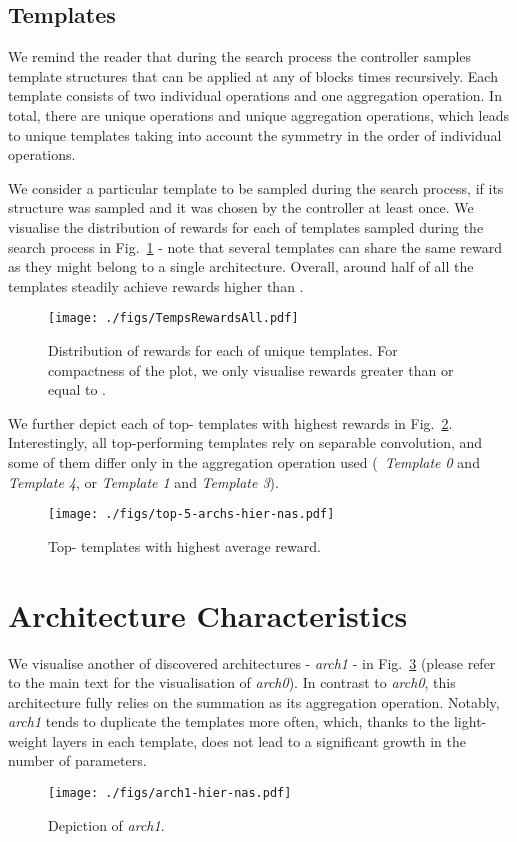 \documentclass[10pt,twocolumn,letterpaper]{article}
\begin{document}
 \subsection*{Templates}
 
 We remind the reader that during the search process the controller samples  template structures that can be applied at any of  blocks  times recursively. Each template consists of two individual operations and one aggregation operation. In total, there are  unique operations and  unique aggregation operations, which leads to  unique templates taking into account the symmetry in the order of individual operations.
 
 We consider a particular template to be sampled during the search process, if its structure was sampled and it was chosen by the controller at least once. We visualise the distribution of rewards for each of  templates sampled during the search process in Fig.~\ref{fig:temp-rew-all} - note that several templates can share the same reward as they might belong to a single architecture. Overall, around half of all the templates steadily achieve rewards higher than .
 
 \begin{figure}[thb]
 	\begin{center}
 		\texttt{[image: ./figs/TempsRewardsAll.pdf]}
 	\end{center}
 	\vskip -0.2in
 	\caption{
 		Distribution of rewards for each of  unique templates. For compactness of the plot, we only visualise rewards greater than or equal to .\label{fig:temp-rew-all}}
 \end{figure}
 
 We further depict each of top- templates with highest rewards in Fig.~\ref{fig:temp-top}. Interestingly, all top-performing templates rely on separable  convolution, and some of them differ only in the aggregation operation used (\eg~{\em Template 0} and {\em Template 4}, or {\em Template 1} and {\em Template 3}). 
 
 \begin{figure}[thb]
 	\begin{center}
 		\texttt{[image: ./figs/top-5-archs-hier-nas.pdf]}
 	\end{center}
 	\caption{
 		Top- templates with highest average reward.\label{fig:temp-top}}
 \end{figure}
 
 \section{Architecture Characteristics}
 We visualise another of discovered architectures - {\em arch1} - in Fig.~\ref{fig:arch1} (please refer to the main text for the visualisation of {\em arch0}). In contrast to {\em arch0}, this architecture fully relies on the summation as its aggregation operation. Notably, {\em arch1} tends to duplicate the templates more often, which, thanks to the light-weight layers in each template, does not lead to a significant growth in the number of parameters.
 
 \begin{figure}[thb]
 	\begin{center}
 		\texttt{[image: ./figs/arch1-hier-nas.pdf]}
 	\end{center}
 	\caption{Depiction of {\em arch1}.\label{fig:arch1}}
 \end{figure}
\end{document}

